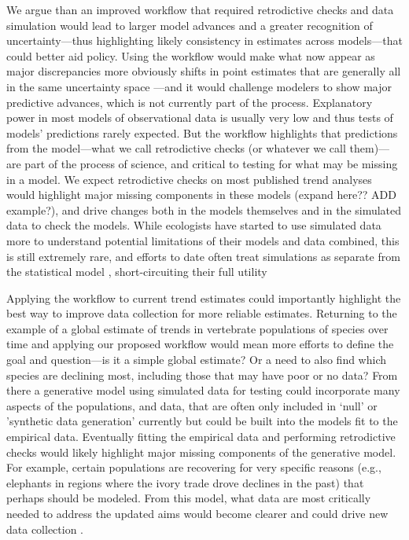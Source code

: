 \documentclass[11pt]{article}
\begin{document}
We argue than an improved workflow that required retrodictive checks and data simulation would lead to larger model advances and a greater recognition of uncertainty---thus highlighting likely consistency in estimates across models---that could better aid policy.  Using the workflow would make what now appear as major discrepancies more obviously shifts in point estimates that are generally all in the same uncertainty space \citep{Johnson2024}---and it would challenge modelers to show major predictive advances, which is not currently part of the process. Explanatory power in most models of observational data is usually very low \citep{low2014rising,moller2002much} and thus tests of models' predictions rarely expected. But the workflow highlights that predictions from the model---what we call retrodictive checks (or whatever we call them)---are part of the process of science, and critical to testing for what may be missing in a model. We expect retrodictive checks on most published trend analyses would highlight major missing components in these models (expand here?? ADD example?), and drive changes both in the models themselves and in the simulated data to check the models. While ecologists have started to use simulated data more to understand potential limitations of their models and data combined, this is still extremely rare, and efforts to date often treat simulations as separate from the statistical model \citep{Buschke2021,dove2023quantifying}, short-circuiting their full utility

Applying the workflow to current trend estimates could importantly highlight the best way to improve data collection for more reliable estimates. Returning to the example of a global estimate of trends in vertebrate populations of species over time and applying our proposed workflow would mean more efforts to define the goal and question---is it a simple global estimate? Or a need to also find which species are declining most, including those that may have poor or no data? From there a generative model using simulated data for testing could incorporate many aspects of the populations, and data, that are often only included in `null' or 'synthetic data generation' currently \citep{Buschke2021,mcrae2025utility} but could be built into the models fit to the empirical data. Eventually fitting the empirical data and performing retrodictive checks would likely highlight major missing components of the generative model. For example, certain populations are recovering for very specific reasons (e.g., elephants in regions where the ivory trade drove declines in the past) that perhaps should be modeled. From this model, what data are most critically needed to address the updated aims would become clearer and could drive new data collection \citep{toszogyova2024mathematical}. 
\end{document}
